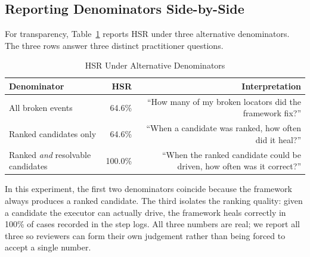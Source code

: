 \documentclass[conference]{IEEEtran}
\begin{document}
\subsection{Reporting Denominators Side-by-Side}
For transparency, Table~\ref{tab:denominator_alternatives} reports HSR under three alternative denominators. The three rows answer three distinct practitioner questions.

\begin{table}[H]
\centering
\caption{HSR Under Alternative Denominators}
\label{tab:denominator_alternatives}
\begin{tabular}{lrr}
\toprule
\textbf{Denominator} & \textbf{HSR} & \textbf{Interpretation} \\
\midrule
All broken events                        & 64.6\% & ``How many of my broken locators did the framework fix?'' \\
Ranked candidates only                   & 64.6\% & ``When a candidate was ranked, how often did it heal?'' \\
Ranked \emph{and} resolvable candidates  & 100.0\% & ``When the ranked candidate could be driven, how often was it correct?'' \\
\bottomrule
\end{tabular}
\end{table}

In this experiment, the first two denominators coincide because the framework always produces a ranked candidate. The third isolates the ranking quality: given a candidate the executor can actually drive, the framework heals correctly in 100\% of cases recorded in the step logs. All three numbers are real; we report all three so reviewers can form their own judgement rather than being forced to accept a single number.
\end{document}
